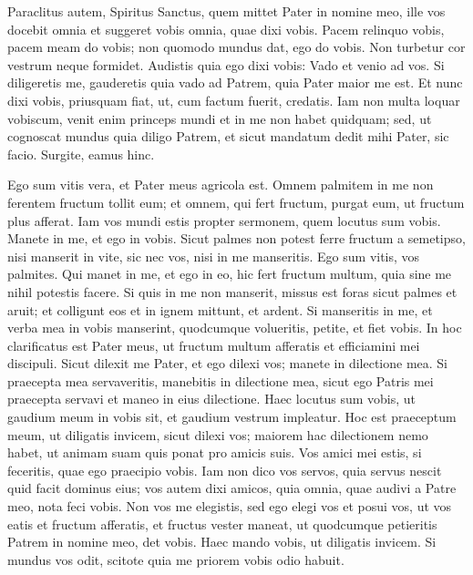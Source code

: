 \begin{biblechapter}
\begin{biblechapter}
\begin{biblechapter}
\begin{biblechapter}
\begin{biblechapter}
\begin{biblechapter}
\begin{biblechapter}
\begin{biblechapter}
\begin{biblechapter}
\begin{biblechapter}
\begin{biblechapter}
\begin{biblechapter}
\begin{biblechapter}
\begin{biblechapter}
\verse Paraclitus autem, Spiritus Sanctus, quem mittet Pater in nomine meo, ille vos docebit omnia et suggeret vobis omnia, quae dixi vobis. 
\verse Pacem relinquo vobis, pacem meam do vobis; non quomodo mundus dat, ego do vobis. Non turbetur cor vestrum neque formidet. 
 \verse Audistis quia ego dixi vobis: Vado et venio ad vos. Si diligeretis me, gauderetis quia vado ad Patrem, quia Pater maior me est. 
\verse Et nunc dixi vobis, priusquam fiat, ut, cum factum fuerit, credatis. 
\verse Iam non multa loquar vobiscum, venit enim princeps mundi et in me non habet quidquam; 
\verse sed, ut cognoscat mundus quia diligo Patrem, et sicut mandatum dedit mihi Pater, sic facio. Surgite, eamus hinc.
 
\begin{biblechapter}
\verse Ego sum vitis vera, et Pater meus agricola est. 
\verse Omnem palmitem in me non ferentem fructum tollit eum; et omnem, qui fert fructum, purgat eum, ut fructum plus afferat. 
\verse Iam vos mundi estis propter sermonem, quem locutus sum vobis. 
 \verse Manete in me, et ego in vobis. Sicut palmes non potest ferre fructum a semetipso, nisi manserit in vite, sic nec vos, nisi in me manseritis. 
\verse Ego sum vitis, vos palmites. Qui manet in me, et ego in eo, hic fert fructum multum, quia sine me nihil potestis facere. 
\verse Si quis in me non manserit, missus est foras sicut palmes et aruit; et colligunt eos et in ignem mittunt, et ardent. 
 \verse Si manseritis in me, et verba mea in vobis manserint, quodcumque volueritis, petite, et fiet vobis. 
\verse In hoc clarificatus est Pater meus, ut fructum multum afferatis et efficiamini mei discipuli. 
\verse Sicut dilexit me Pater, et ego dilexi vos; manete in dilectione mea. 
\verse Si praecepta mea servaveritis, manebitis in dilectione mea, sicut ego Patris mei praecepta servavi et maneo in eius dilectione. 
\verse Haec locutus sum vobis, ut gaudium meum in vobis sit, et gaudium vestrum impleatur.
 \verse Hoc est praeceptum meum, ut diligatis invicem, sicut dilexi vos; 
\verse maiorem hac dilectionem nemo habet, ut animam suam quis ponat pro amicis suis. 
 \verse Vos amici mei estis, si feceritis, quae ego praecipio vobis. 
\verse Iam non dico vos servos, quia servus nescit quid facit dominus eius; vos autem dixi amicos, quia omnia, quae audivi a Patre meo, nota feci vobis. 
\verse Non vos me elegistis, sed ego elegi vos et posui vos, ut vos eatis et fructum afferatis, et fructus vester maneat, ut quodcumque petieritis Patrem in nomine meo, det vobis. 
 \verse Haec mando vobis, ut diligatis invicem.
 \verse Si mundus vos odit, scitote quia me priorem vobis odio habuit. 

\end{biblechapter}
\end{biblechapter}
\end{biblechapter}
\end{biblechapter}
\end{biblechapter}
\end{biblechapter}
\end{biblechapter}
\end{biblechapter}
\end{biblechapter}
\end{biblechapter}
\end{biblechapter}
\end{biblechapter}
\end{biblechapter}
\end{biblechapter}
\end{biblechapter}
